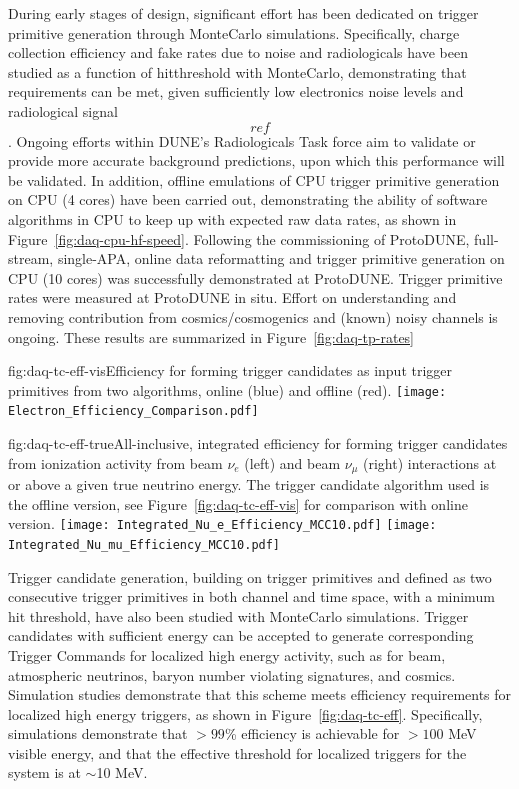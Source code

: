 During early stages of design, significant effort has been dedicated on trigger primitive generation
through MonteCarlo simulations. Specifically, charge collection efficiency and fake rates
due to noise and radiologicals have been studied as a function of
hitthreshold with MonteCarlo, demonstrating that requirements can be
met, given sufficiently low electronics noise levels and radiological
signal \[ref\]. Ongoing efforts within DUNE's Radiologicals Task force
aim to validate or provide more accurate background predictions, upon
which this performance will be validated. In addition, offline emulations
of CPU trigger primitive generation on CPU (4 cores) have been carried
out, demonstrating the ability of software algorithms in CPU to keep
up with expected raw data rates, as shown in Figure~\ref{fig:daq-cpu-hf-speed}. 
Following the commissioning of ProtoDUNE, full-stream, single-APA,
online data reformatting and trigger primitive generation on CPU (10 cores) was successfully
demonstrated at ProtoDUNE. Trigger primitive rates were measured at
ProtoDUNE in situ. Effort on understanding and removing contribution
from cosmics/cosmogenics and (known) noisy channels is ongoing.
These results are summarized in Figure~\ref{fig:daq-tp-rates}

\begin{dunefigure}{fig:daq-tc-eff-vis}{Efficiency for forming trigger candidates as input trigger primitives from two algorithms, online (blue) and offline (red).}
  \texttt{[image: Electron\_Efficiency\_Comparison.pdf]}
\end{dunefigure}

\begin{dunefigure}{fig:daq-tc-eff-true}{All-inclusive, integrated efficiency for forming trigger candidates from ionization activity from beam $\nu_e$ (left) and beam $\nu_\mu$ (right) interactions at or above a given true neutrino energy.  The trigger candidate algorithm used is the offline version, see Figure~\ref{fig:daq-tc-eff-vis} for comparison with online version.}
  \texttt{[image: Integrated\_Nu\_e\_Efficiency\_MCC10.pdf]}%
  \texttt{[image: Integrated\_Nu\_mu\_Efficiency\_MCC10.pdf]}
\end{dunefigure}


Trigger candidate generation, building on trigger primitives and defined
as two consecutive trigger primitives in both channel and time space,
with a minimum hit threshold, have also been studied with MonteCarlo
simulations. Trigger candidates with sufficient energy can be accepted
to generate corresponding Trigger Commands for localized high energy
activity, such as for beam, atmospheric neutrinos, baryon number
violating signatures, and cosmics. Simulation studies demonstrate that
this scheme meets efficiency requirements for localized high energy
triggers, as shown in Figure~\ref{fig:daq-tc-eff}. Specifically,
simulations demonstrate that $>99$\% efficiency is achievable for
$>100$ MeV visible energy, and that the effective threshold for
localized triggers for the system is at $\sim$10 MeV. 

